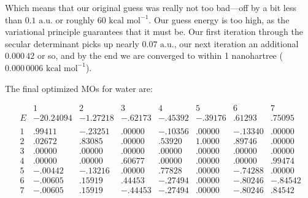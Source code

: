 \documentclass[
  9pt,
]{extbook}
\theoremstyle{definition}
\theoremstyle{definition}
\theoremstyle{definition}
\theoremstyle{remark}
\begin{document}
Which means that our original guess was really not too bad---off by a bit less than \(0.1\text{ a.u.}\) or roughly \(60\text{ kcal mol}^{-1}\). Our guess energy is too high, as the variational principle guarantees that it must be. Our first iteration through the secular determinant picks up nearly \(0.07\text{ a.u.}\), our next iteration an additional \(0.000\,42\) or so, and by the end we are converged to within 1 nanohartree (\(0.000\,000 6\text{ kcal mol}^{-1}\)).

The final optimized MOs for water are:

\begin{equation}
\begin{matrix}                  
& 1 & 2 & 3 & 4 & 5 & 6 & 7 \\\
E  & -20.24094 &  -1.27218   &   -.62173    &  -.45392     &    -.39176    &   .61293    & .75095 \\\
\\\
1                & .99411    &   -.23251   &   .00000     &  -.10356     &    .00000     &   -.13340   & .00000   \\\
2                & .02672    &   .83085    &  .00000      & .53920       &  1.0000      &  .89746     & .00000  \\\
3                & .00000    &   .00000    &  .00000      & .00000       &  .00000       & .00000      & .00000  \\\
4                & .00000    &   .00000    & .60677       &  .00000      &   .00000      &  .00000     & .99474  \\\
5                & -.00442   &    -.13216  &    .00000    &   .77828     &    .00000     &  -.74288    &  .00000  \\\
6                & -.00605   &    .15919   &   .44453     &  -.27494     &    .00000     &  -.80246    &  -.84542  \\\
7                &  -.00605  &     .15919  &     -.44453  &     -.27494  &       .00000  &     -.80246 &     .84542 \\\
\end{matrix}
\label{eq:eigenvalMO}
\end{equation}
\end{document}
